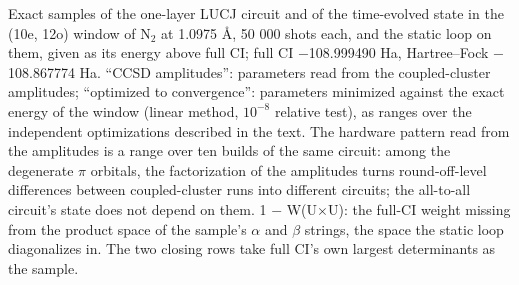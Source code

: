 \documentclass[11pt]{article}
\begin{document}
\begin{table}[htbp]
\centering
\caption{Exact samples of the one-layer LUCJ circuit and of the time-evolved state in the (10e, 12o) window of N$_2$ at 1.0975 \AA{}, 50 000 shots each, and the static loop on them, given as its energy above full CI; full CI $-$108.999490 Ha, Hartree--Fock $-$108.867774 Ha. ``CCSD amplitudes'': parameters read from the coupled-cluster amplitudes; ``optimized to convergence'': parameters minimized against the exact energy of the window (linear method, $10^{-8}$ relative test), as ranges over the independent optimizations described in the text. The hardware pattern read from the amplitudes is a range over ten builds of the same circuit: among the degenerate $\pi$ orbitals, the factorization of the amplitudes turns round-off-level differences between coupled-cluster runs into different circuits; the all-to-all circuit's state does not depend on them. 1 $-$ W(U$\times$U): the full-CI weight missing from the product space of the sample's $\alpha$ and $\beta$ strings, the space the static loop diagonalizes in. The two closing rows take full CI's own largest determinants as the sample.}\label{tab:10}
\footnotesize
\renewcommand{\arraystretch}{1.15}


\end{table}
\end{document}
